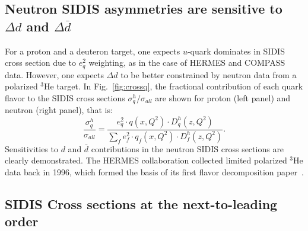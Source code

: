 \subsection{Neutron SIDIS asymmetries are sensitive to $\Delta d$ and $\Delta \bar{d}$}
For a proton and a deuteron target, one expects $u$-quark dominates in SIDIS cross section 
due to $e_q^2$ weighting, as in the case of HERMES and COMPASS data. However,  
one expects $\Delta d$ to be better constrained by neutron data from a polarized $^3$He target.
In Fig.~\ref{fig:crossq}, the fractional contribution of each quark flavor 
to the SIDIS cross sections $\sigma_q^h/\sigma_{all}$ are shown for proton (left panel) and neutron (right panel),
 that is:
\begin{equation}
{\frac{\sigma_q^h}{\sigma_{all}}}= {\frac{e_q^2 \cdot q(x,Q^2) \cdot D_q^h(z,Q^2)} {\sum_f e_f^2 \cdot  q_f(x,Q^2)\cdot D_f^h(z,Q^2)}}.
\end{equation} 
Sensitivities to $d$ and $\bar{d}$ contributions in the neutron SIDIS cross sections are clearly demonstrated.
 The HERMES collaboration collected limited polarized $^3$He data back
in 1996, which formed the basis of its first flavor decomposition paper~\cite{hermes99}.   

\subsection{SIDIS Cross sections at the next-to-leading order}


